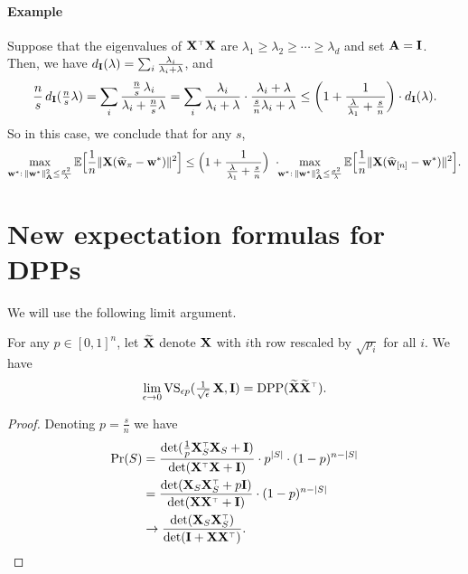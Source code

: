 \documentclass[12pt]{sty/colt2019/colt2018-arxiv}
\begin{document}
\paragraph{Example} Suppose that the eigenvalues of $\X^\top\X$ are
$\lambda_1\geq\lambda_2\geq\cdots\geq\lambda_d$
and set $\mathbf A=\mathbf I$. Then,
we have $d_\mathbf I(\lambda) = \sum_i\frac{\lambda_i}{\lambda_i+\lambda}$, and 
\begin{align*}
  \frac ns \,d_\mathbf I(\tfrac ns\lambda) = \sum_i\frac{\frac
  ns\,\lambda_i}{\lambda_i+\frac ns \lambda} = \sum_i \frac
  {\lambda_i}{\lambda_i+\lambda}\cdot \frac {\lambda_i+\lambda}{\frac
  sn\lambda_i+\lambda}\leq \bigg(1+\frac1{\frac
  \lambda{\lambda_1}+\frac sn}\bigg)\cdot d_\mathbf I(\lambda).
\end{align*}
So in this case, we conclude that for any $s$,
\begin{align*}
\max_{\mathbf w^*:\,\|\mathbf w^*\|_\mathbf A^2\leq \frac{\sigma^2}{\lambda}}
  \mathbb E\Big[\frac1n\|\mathbf X(\widehat{\mathbf w}_\pi-\mathbf w^*)\|^2\Big]
  \leq \Big(1+\frac1{\frac\lambda{\lambda_1}+\frac sn}\Big)\ \cdot\!\!
  \max_{\mathbf w^*:\,\|\mathbf w^*\|_\mathbf A^2\leq \frac{\sigma^2}{\lambda}}
  \mathbb E\Big[\frac1n\|\mathbf X(\widehat{\mathbf w}_{[n]}-\mathbf w^*)\|^2\Big].
\end{align*}

\section{New expectation formulas for DPPs}
We will use the following limit argument.
\begin{lemma}
For any $p\in[0,1]^n$, let $\widetilde{\mathbf{X}}$ denote $\mathbf X$ with $i$th
  row rescaled by $\sqrt{p_i}$ for all $i$. We have
  \[\lim_{\epsilon\rightarrow 0}\Vol_{\epsilon
    p}(\tfrac1{\sqrt\epsilon}\,\X,\I) =\DPP(\Xt\Xt^\top).\]
\end{lemma}
\begin{proof}
  Denoting $p=\frac sn$ we have
  \begin{align*}
    \Pr(S)
&= \frac{\det(\frac1p\X_S^\top\X_S+\I)}{\det(\X^\top\X+\I)}\cdot
    p^{|S|}\cdot (1-p)^{n-|S|}\\
&=    \frac{\det(\X_S\X_S^\top+p\I)}{\det(\X\X^\top+\I)}\cdot
                                   (1-p)^{n-|S|}\\
&\rightarrow \frac{\det(\X_S\X_S^\top)}{\det(\I+\X\X^\top)}.
  \end{align*}
\end{proof}
\end{document}
